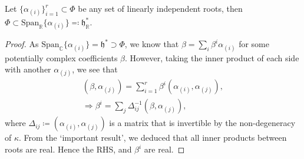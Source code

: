 \documentclass[11pt,fleqn]{article}
\renewenvironment{prop}{\begin{pBox}\begin{propT}}{\end{propT}\end{pBox}}
\begin{document}
\begin{prop}
	Let $\{ \alpha_{(i)} \}_{i=1}^r \subset \Phi$ be any set of linearly independent roots, then $\Phi \subset \text{Span}_\mathbb{R} \{ \alpha_{(i)} \} \eqqcolon \mathfrak{h}^*_\mathbb{R}$.
\end{prop}
\begin{proof}
	As $\text{Span}_\mathbb{C} \{\alpha_{(i)} \} = \mathfrak{h}^* \supset \Phi$, we know that $\beta = \sum_i \beta^i \alpha_{(i)}$ for some potentially complex coefficients $\beta$. However, taking the inner product of each side with another $\alpha_{(j)}$, we see that
		\begin{equation}\begin{split}
			(\beta, \alpha_{(j)}) = \sum_{i=1}^r \beta^i (\alpha_{(i)},\alpha_{(j)}), \\
			\Rightarrow \beta^i = \sum_j \Delta^{-1}_{ij} (\beta, \alpha_{(j)}),
		\end{split}\end{equation}
	where $\Delta_{ij} \coloneqq (\alpha_{(i)},\alpha_{(j)})$ is a matrix that is invertible by the non-degeneracy of $\kappa$. From the `important result', we deduced that all inner products between roots are real. Hence the RHS, and $\beta^i$ are real.
\end{proof}
\end{document}
